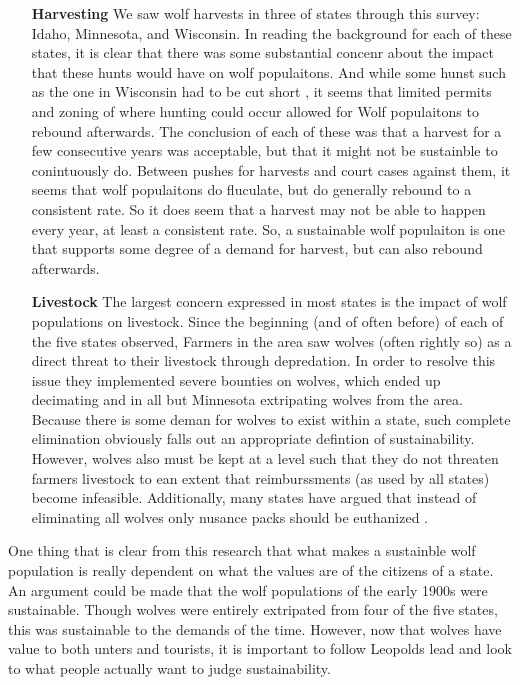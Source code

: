 \documentclass[12pt]{article}
\begin{document}
\begin{enumerate}
\item [\textbf{Harvesting}]
We saw wolf harvests in three of states through this survey: Idaho, Minnesota, and Wisconsin. 
In reading the background for each of these states,
it is clear that there was some substantial concenr about the impact that these hunts would have on wolf populaitons.
And while some hunst such as the one in Wisconsin had to be cut short \cite{Milwauke},
it seems that limited permits and zoning of where hunting could occur allowed for Wolf populaitons to rebound afterwards.
The conclusion of each of these was that a harvest for a few consecutive years was acceptable, but that it might not be sustainble to conintuously do.
Between pushes for harvests and court cases against them,
it seems that wolf populaitons do fluculate, 
but do generally rebound to a consistent rate.
So it does seem that a harvest may not be able to happen every year, at least a consistent rate. 
So, a sustainable wolf populaiton is one that supports some degree of a demand for harvest,
but can also rebound afterwards.

\item [\textbf{Livestock}]
The largest concern expressed in most states is the impact of wolf populations on livestock.
Since the beginning (and of often before) of each of the five states observed,
Farmers in the area saw wolves (often rightly so) as a direct threat to their livestock through depredation.
In order to resolve this issue they implemented severe bounties on wolves, 
which ended up decimating and in all but Minnesota extripating wolves from the area.
Because there is some deman for wolves to exist within a state, 
such complete elimination obviously falls out an appropriate defintion of sustainability.
However, wolves also must be kept at a level such that they do not threaten farmers livestock to ean extent that 
reimburssments (as used by all states) become infeasible.
Additionally, many states have argued that instead of eliminating all wolves only nusance packs should be euthanized 
\cite{2015PlanMI} \cite{2014Depredation} \cite{2018ReportMN}.
\end{enumerate}

One thing that is clear from this research that what makes a sustainble wolf population 
is really dependent on what the values are of the citizens of a state.
An argument could be made that the wolf populations of the early 1900s were sustainable.
Though wolves were entirely extripated from four of the five states,
this was sustainable to the demands of the time.
However, now that wolves have value to both unters and tourists,
it is important to follow Leopolds lead and look to what people actually want to judge sustainability.
\end{document}
